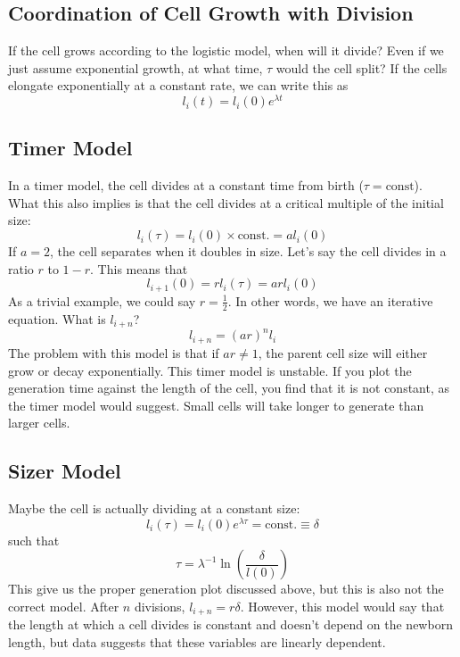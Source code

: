\documentclass[a4paper,twoside,master.tex]{subfiles}
\begin{document}
\subsection{Coordination of Cell Growth with Division}\label{sub:coordination_of_cell_growth_with_division}

If the cell grows according to the logistic model, when will it divide? Even if we just assume exponential growth, at what time, $ \tau $ would the cell split? If the cells elongate exponentially at a constant rate, we can write this as
\begin{equation}
    l_i(t) = l_i(0) e^{\lambda t}
\end{equation}

\subsection{Timer Model}\label{sub:timer_model}

In a timer model, the cell divides at a constant time from birth ($ \tau = \text{const} $). What this also implies is that the cell divides at a critical multiple of the initial size:
\begin{equation}
    l_i(\tau) = l_i(0) \times \text{const.} = a l_i(0)
\end{equation}
If $ a = 2 $, the cell separates when it doubles in size. Let's say the cell divides in a ratio $ r $ to $ 1-r $. This means that
\begin{equation}
    l_{i+1}(0) = r l_i(\tau) = a r l_i(0)
\end{equation}
As a trivial example, we could say $ r = \frac{1}{2} $. In other words, we have an iterative equation. What is $ l_{i + n} $?
\begin{equation}
    l_{i + n} = (ar)^n l_i
\end{equation}
The problem with this model is that if $ ar \neq 1 $, the parent cell size will either grow or decay exponentially. This timer model is unstable. If you plot the generation time against the length of the cell, you find that it is not constant, as the timer model would suggest. Small cells will take longer to generate than larger cells.

\subsection{Sizer Model}\label{sub:sizer_model}

Maybe the cell is actually dividing at a constant size:
\begin{equation}
    l_i(\tau) = l_i(0) e^{\lambda \tau} = \text{const.} \equiv \delta
\end{equation}
such that
\begin{equation}
    \tau = \lambda^{-1} \ln(\frac{\delta}{l(0)})
\end{equation}
This give us the proper generation plot discussed above, but this is also not the correct model. After $ n $ divisions, $ l_{i + n} = r \delta $. However, this model would say that the length at which a cell divides is constant and doesn't depend on the newborn length, but data suggests that these variables are linearly dependent.
\end{document}
